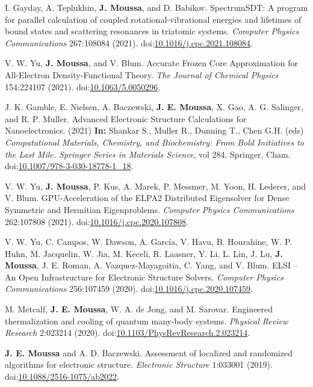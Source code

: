 \documentclass[10pt]{article}
\makeatletter
\newlength{\bibhang}
\newlength{\bibsep}
 {\@listi \global\bibsep\itemsep \global\advance\bibsep by\parsep}
\newenvironment{bibsection}%
        {\vspace{-1.6\baselineskip}\begin{etaremune}[leftmargin=1.6em]{%
       \setlength{\leftmargin}{\bibhang}%
       \setlength{\itemindent}{-\leftmargin}%
       \setlength{\itemsep}{\bibsep}%
       \setlength{\parsep}{\z@}%
        \setlength{\partopsep}{0pt}%
        \setlength{\topsep}{0pt}}}
        {\end{etaremune}\vspace{-.6\baselineskip}}
\newcommand\doilink[1]{\href{http://dx.doi.org/#1}{#1}}
\newcommand\doi[1]{doi:\doilink{#1}}
\makeatother
\begin{document}
\begin{bibsection}
    \item I. Gayday, A. Teplukhin, \textbf{J. Moussa}, and D. Babikov. SpectrumSDT: A program for parallel calculation of coupled rotational-vibrational energies and lifetimes of bound states and scattering resonances in triatomic systems.
    \emph{Computer Physics Communications} 267:108084 (2021). \doi{10.1016/j.cpc.2021.108084}.

    \item V. W. Yu, \textbf{J. Moussa}, and V. Blum. Accurate Frozen Core Approximation for All-Electron Density-Functional Theory.
    \emph{The Journal of  Chemical Physics} 154:224107 (2021). \doi{10.1063/5.0050296}.

    \item J. K. Gamble, E. Nielsen, A. Baczewski, \textbf{J. E. Moussa}, X. Gao, A. G. Salinger, and R. P. Muller. Advanced Electronic Structure Calculations for Nanoelectronics. (2021)
    \textbf{In:} Shankar S., Muller R., Dunning T., Chen G.H. (eds) \emph{Computational Materials, Chemistry, and Biochemistry: From Bold Initiatives to the Last Mile. Springer Series in Materials Science}, vol 284. Springer, Cham. \doi{10.1007/978-3-030-18778-1\_18}.

    \item V. W. Yu, \textbf{J. Moussa}, P. Kus, A. Marek, P. Messmer, M. Yoon, H. Lederer, and V. Blum. GPU-Acceleration of the ELPA2 Distributed Eigensolver for Dense Symmetric and Hermitian Eigenproblems.
    \emph{Computer Physics Communications} 262:107808 (2021). \doi{10.1016/j.cpc.2020.107808}.

    \item V. W. Yu, C. Campos, W. Dawson, A. García, V. Havu, B. Hourahine, W. P. Huhn, M. Jacquelin, W. Jia, M. Keceli, R. Laasner, Y. Li, L. Lin, J. Lu, \textbf{J. Moussa}, J. E. Roman, A. Vazquez-Mayagoitia, C. Yang, and V. Blum. ELSI -- An Open Infrastructure for Electronic Structure Solvers.
    \emph{Computer Physics Communications} 256:107459 (2020). \doi{10.1016/j.cpc.2020.107459}.

    \item M. Metcalf, \textbf{J. E. Moussa}, W. A. de Jong, and M. Sarovar. Engineered thermalization and cooling of quantum many-body systems.
    \emph{Physical Review Research} 2:023214 (2020). \doi{10.1103/PhysRevResearch.2.023214}.

    \item \textbf{J. E. Moussa} and A. D. Baczewski. Assessment of localized and randomized algorithms for electronic structure.
    \emph{Electronic Structure} 1:033001 (2019). \doi{10.1088/2516-1075/ab2022}.


\end{bibsection}
\end{document}
